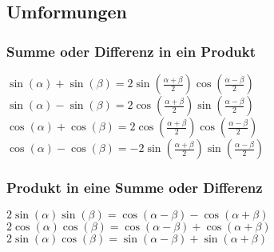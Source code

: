 	\vspace{10mm}
	\subsection{Umformungen}
	
	\vspace{10mm}
	\subsubsection{Summe oder Differenz in ein Produkt}
	
	
			\begin{flushleft}
				\(\sin \left( \alpha \right) + \sin \left( \beta \right) = 2 \sin \left( \frac{\alpha + \beta}{2}\right) \cos \left( \frac{\alpha - \beta}{2} \right)\)
				\\
				\(\sin \left( \alpha \right) - \sin \left( \beta \right) = 2 \cos \left( \frac{\alpha + \beta}{2}\right) \sin \left( \frac{\alpha - \beta}{2} \right)\)
				\\
				\(\cos \left( \alpha \right) + \cos \left( \beta \right) = 2 \cos \left( \frac{\alpha + \beta}{2}\right) \cos \left( \frac{\alpha - \beta}{2} \right)\)
				\\
				\(\cos \left( \alpha \right) - \cos \left( \beta \right) = -2 \sin \left( \frac{\alpha + \beta}{2}\right) \sin \left( \frac{\alpha - \beta}{2} \right)\)
			\end{flushleft}
	
	\vspace{10mm}
	\subsubsection{Produkt in eine Summe oder Differenz}
	
	
			\begin{flushleft}
				\(2 \sin \left( \alpha \right) \sin \left( \beta \right) = \cos \left( \alpha - \beta \right) - \cos \left( \alpha + \beta \right)\)
				\\
				\(2 \cos \left( \alpha \right) \cos \left( \beta \right) = \cos \left( \alpha - \beta \right) + \cos \left( \alpha + \beta \right)\)
				\\
				\(2 \sin \left( \alpha \right) \cos \left( \beta \right) = \sin \left( \alpha - \beta \right) + \sin \left( \alpha + \beta \right)\)
			\end{flushleft}
	
	\vspace{10mm}	
